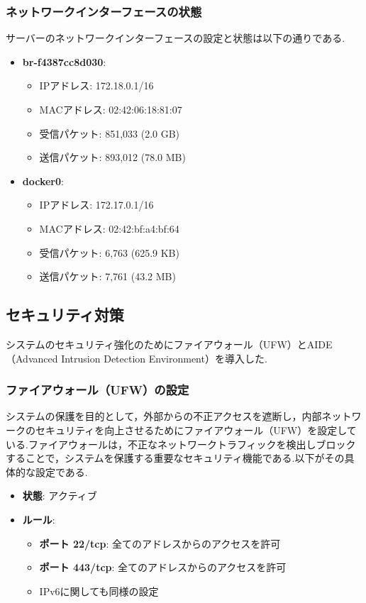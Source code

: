 \documentclass[b5paper,12pt,dvipdfmx]{jsreport}
\begin{document}
\subsubsection{ネットワークインターフェースの状態}
サーバーのネットワークインターフェースの設定と状態は以下の通りである.
\begin{itemize}
    \item \textbf{br-f4387cc8d030}:
    \begin{itemize}
        \item IPアドレス: 172.18.0.1/16
        \item MACアドレス: 02:42:06:18:81:07
        \item 受信パケット: 851,033 (2.0 GB)
        \item 送信パケット: 893,012 (78.0 MB)
    \end{itemize}

    \item \textbf{docker0}:
    \begin{itemize}
        \item IPアドレス: 172.17.0.1/16
        \item MACアドレス: 02:42:bf:a4:bf:64
        \item 受信パケット: 6,763 (625.9 KB)
        \item 送信パケット: 7,761 (43.2 MB)
    \end{itemize}
\end{itemize}


\subsection{セキュリティ対策}

システムのセキュリティ強化のためにファイアウォール（UFW）とAIDE（Advanced Intrusion Detection Environment）を導入した.

\subsubsection{ファイアウォール（UFW）の設定}
システムの保護を目的として，外部からの不正アクセスを遮断し，内部ネットワークのセキュリティを向上させるためにファイアウォール（UFW）を設定している.ファイアウォールは，不正なネットワークトラフィックを検出しブロックすることで，システムを保護する重要なセキュリティ機能である.以下がその具体的な設定である.

\begin{itemize}
    \item \textbf{状態}: アクティブ
    \item \textbf{ルール}:
    \begin{itemize}
        \item \textbf{ポート 22/tcp}: 全てのアドレスからのアクセスを許可
        \item \textbf{ポート 443/tcp}: 全てのアドレスからのアクセスを許可
        \item IPv6に関しても同様の設定
    \end{itemize}
\end{itemize}
\end{document}
